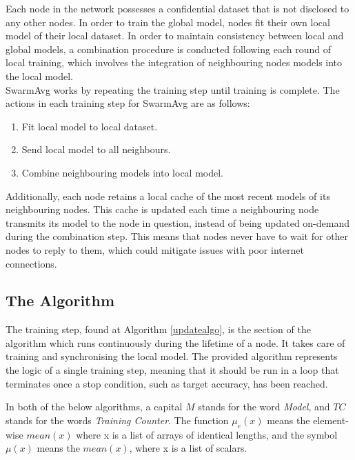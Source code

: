 \documentclass[letterpaper, 10 pt, conference]{ieeeconf}  %
\begin{document}
Each node in the network possesses a confidential dataset that is not disclosed to any other nodes. In order to train the global model, nodes fit their own local model of their local dataset. In order to maintain consistency between local and global models, a combination procedure is conducted following each round of local training, which involves the integration of neighbouring nodes models into the local model. \\

SwarmAvg works by repeating the training step until training is complete. The actions in each training step for SwarmAvg are as follows:
\begin{enumerate}
	\item Fit local model to local dataset.
	\item Send local model to all neighbours.
	\item Combine neighbouring models into local model.
\end{enumerate}

Additionally, each node retains a local cache of the most recent models of its neighbouring nodes. This cache is updated each time a neighbouring node transmits its model to the node in question, instead of being updated on-demand during the combination step. This means that nodes never have to wait for other nodes to reply to them, which could mitigate issues with poor internet connections.

\subsection{The Algorithm}
The training step, found at Algorithm \ref{updatealgo}, is the section of the algorithm which runs continuously during the lifetime of a node. It takes care of training and synchronising the local model. The provided algorithm represents the logic of a single training step, meaning that it should be run in a loop that terminates once a stop condition, such as target accuracy, has been reached.

In both of the below algorithms, a capital $M$ stands for the word \emph{Model}, and $TC$ stands for the words \emph{Training Counter}. The function $\mu_e(x)$ means the element-wise $mean(x)$ where x is a list of arrays of identical lengths, and the symbol $\mu(x)$ means the $mean(x)$, where x is a list of scalars.
\end{document}
